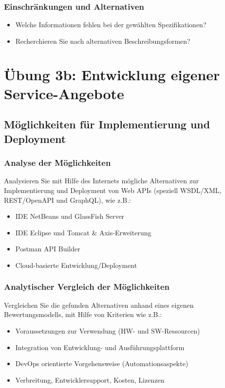 \documentclass[notitlepage, hidelinks]{article}
\begin{document}
\subsubsection{Einschränkungen und Alternativen}
\begin{itemize}
\item Welche Informationen fehlen bei der gewählten Spezifikationen?
\item Recherchieren Sie nach alternativen Beschreibungsformen?
\end{itemize}


\newpage
\section{Übung 3b: Entwicklung eigener Service-Angebote}
\subsection{Möglichkeiten für Implementierung und Deployment}
\subsubsection{Analyse der Möglichkeiten}
Analysieren Sie mit Hilfe des Internets mögliche Alternativen zur Implementierung und Deployment von Web APIs (speziell WSDL/XML, REST/OpenAPI und GraphQL), wie z.B.:
\begin{itemize}
\item IDE NetBeans und GlassFish Server
\item IDE Eclipse und Tomcat \& Axis-Erweiterung
\item Postman API Builder
\item Cloud-basierte Entwicklung/Deployment
\end{itemize}

\subsubsection{Analytischer Vergleich der Möglichkeiten}
Vergleichen Sie die gefunden Alternativen anhand eines eigenen Bewertungsmodells, mit Hilfe von Kriterien wie z.B.:
\begin{itemize}
\item Voraussetzungen zur Verwendung (HW- und SW-Ressourcen)
\item Integration von Entwicklung- und Ausführungsplattform
\item DevOps orientierte Vorgehensweise (Automationsaspekte)
\item Verbreitung, Entwicklersupport, Kosten, Lizenzen
\end{itemize}
\end{document}
